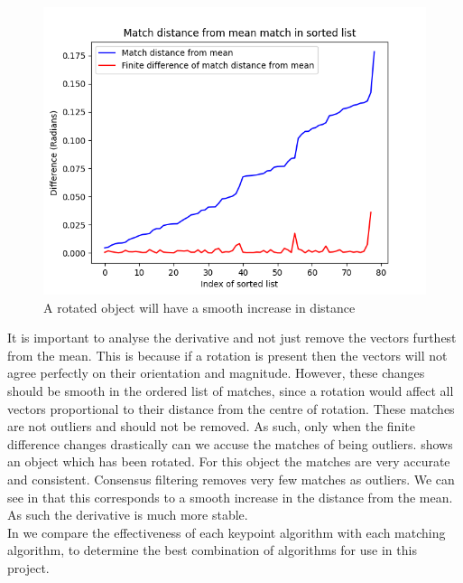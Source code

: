 \begin{figure}[H]
    \centering
    \includegraphics[width=\textwidth]{figures/good-matches.png}
    \caption{A rotated object will have a smooth increase in distance}
    \label{fig:good-matches}
\end{figure}

It is important to analyse the derivative and not just remove the vectors furthest from the mean. This is because if a rotation is present then the vectors will not agree perfectly on their orientation and magnitude. However, these changes should be smooth in the ordered list of matches, since a rotation would affect all vectors proportional to their distance from the centre of rotation. These matches are not outliers and should not be removed. As such, only when the finite difference changes drastically can we accuse the matches of being outliers.  shows an object which has been rotated. For this object the matches are very accurate and consistent. Consensus filtering removes very few matches as outliers. We can see in  that this corresponds to a smooth increase in the distance from the mean. As such the derivative is much more stable.\\

In  we compare the effectiveness of each keypoint algorithm with each matching algorithm, to determine the best combination of algorithms for use in this project.\\




